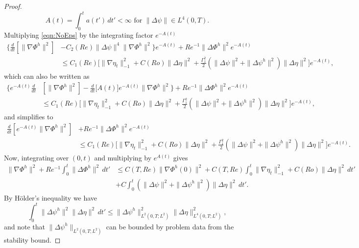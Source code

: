 \begin{proof}
  \begin{equation}
    A(t) = \int_{0}^{t}\! a(t')\, dt' < \infty \text{ for } \|\Delta \psi\| \in
      L^4(0,T).
    \label{eqn:L4Bound}
  \end{equation}
  Multiplying \eqref{eqn:NoEps} by the integrating factor $e^{-A(t)}$
  \begin{align*}
    \biggl\{ \frac{d}{dt}\left[\|\nabla \Phi^h\|^2\right]
      &- C_2(Re) \|\Delta \psi\|^4 \|\nabla \Phi^h\|^2\biggr\} e^{-A(t)}
       + Re^{-1} \|\Delta \Phi^h\|^2 e^{-A(t)} \\
    & \le C_1(Re) \biggl[\|\nabla \eta_t\|_{-1}^2
       + C(Ro) \|\Delta \eta\|^2 + \frac{\Gamma_1^2}{2}
      \left( \|\Delta \psi\|^2 +  \|\Delta \psi^h\|^2\right)
      \|\Delta \eta\|^2\biggr] e^{-A(t)},
  \end{align*}
  which can also be written as
  \begin{align*}
    \biggl\{ e^{-A(t)}\frac{d}{dt}
      & \left[\|\nabla \Phi^h\|^2\right]
      - \frac{d}{dt}\bigl[ A(t)\bigr] e^{-A(t)} \|\nabla \Phi^h\|^2\biggr\}
      + Re^{-1} \|\Delta \Phi^h\|^2 e^{-A(t)} \\
    & \le C_1(Re) \biggl[\|\nabla \eta_t\|_{-1}^2
      + C(Ro) \|\Delta \eta\|^2 + \frac{\Gamma_1^2}{2}
      \left( \|\Delta \psi\|^2 +  \|\Delta \psi^h\|^2\right)
      \|\Delta \eta\|^2\biggr] e^{-A(t)},
  \end{align*}
  and simplifies to
  \begin{align*}
    \frac{d}{dt}\left[e^{-A(t)} \|\nabla \Phi^h\|^2\right]
      &+ Re^{-1} \|\Delta \Phi^h\|^2 e^{-A(t)} \\
    & \le C_1(Re) \biggl[\|\nabla \eta_t\|_{-1}^2
      + C(Ro) \|\Delta \eta\|^2 + \frac{\Gamma_1^2}{2}
      \left( \|\Delta \psi\|^2 +  \|\Delta \psi^h\|^2\right)
      \|\Delta \eta\|^2\biggr] e^{-A(t)}.
  \end{align*}
  Now, integrating over $(0,t)$ and multiplying by $e^{A(t)}$ gives
  \begin{align*}
    \|\nabla \Phi^h\|^2 + Re^{-1} \int_0^t\! \|\Delta \Phi^h\|^2\, dt'
      & \le C(T,Re) \|\nabla \Phi^h(0)\|^2 + C(T,Re) \int_0^t\! \|\nabla
      \eta_t\|_{-1}^2 + C(Ro) \|\Delta \eta\|^2\, dt' \\
    & + C \int_0^t\!  \left( \|\Delta \psi\|^2 +  \|\Delta \psi^h\|^2\right)
      \|\Delta \eta\|^2\, dt'.
  \end{align*}
  By H\"older's inequality we have
  \begin{equation}
    \int_0^t\! \|\Delta \psi^h\|^2 \|\Delta \eta\|^2\, dt' \le \|\Delta
      \psi^h\|^2_{L^2(0,T;L^2)} \|\Delta \eta\|^2_{L^4(0,T;L^2)},
    \label{eqn:HolderPsih}
  \end{equation}
  and note that $\|\Delta \psi^h\|_{L^2(0,T;L^2)}$ can be bounded by problem
  data from the stability bound.
\end{proof}

